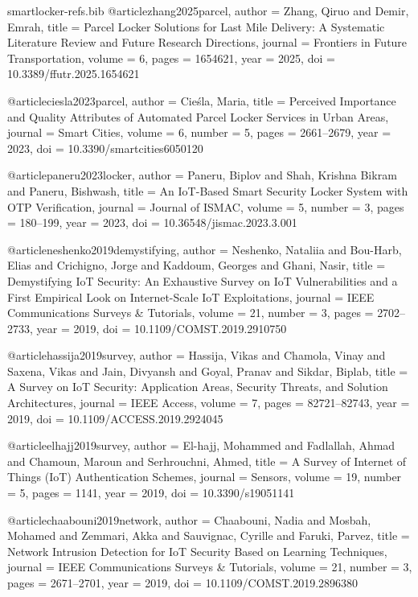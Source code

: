 \begin{filecontents*}[overwrite]{smartlocker-refs.bib}
@article{zhang2025parcel,
  author  = {Zhang, Qiruo and Demir, Emrah},
  title   = {Parcel Locker Solutions for Last Mile Delivery: A Systematic Literature Review and Future Research Directions},
  journal = {Frontiers in Future Transportation},
  volume  = {6},
  pages   = {1654621},
  year    = {2025},
  doi     = {10.3389/ffutr.2025.1654621}
}

@article{ciesla2023parcel,
  author  = {Cie{\'s}la, Maria},
  title   = {Perceived Importance and Quality Attributes of Automated Parcel Locker Services in Urban Areas},
  journal = {Smart Cities},
  volume  = {6},
  number  = {5},
  pages   = {2661--2679},
  year    = {2023},
  doi     = {10.3390/smartcities6050120}
}

@article{paneru2023locker,
  author  = {Paneru, Biplov and Shah, Krishna Bikram and Paneru, Bishwash},
  title   = {An {IoT}-Based Smart Security Locker System with {OTP} Verification},
  journal = {Journal of ISMAC},
  volume  = {5},
  number  = {3},
  pages   = {180--199},
  year    = {2023},
  doi     = {10.36548/jismac.2023.3.001}
}

@article{neshenko2019demystifying,
  author  = {Neshenko, Nataliia and Bou-Harb, Elias and Crichigno, Jorge and Kaddoum, Georges and Ghani, Nasir},
  title   = {Demystifying {IoT} Security: An Exhaustive Survey on {IoT} Vulnerabilities and a First Empirical Look on Internet-Scale {IoT} Exploitations},
  journal = {IEEE Communications Surveys \& Tutorials},
  volume  = {21},
  number  = {3},
  pages   = {2702--2733},
  year    = {2019},
  doi     = {10.1109/COMST.2019.2910750}
}

@article{hassija2019survey,
  author  = {Hassija, Vikas and Chamola, Vinay and Saxena, Vikas and Jain, Divyansh and Goyal, Pranav and Sikdar, Biplab},
  title   = {A Survey on {IoT} Security: Application Areas, Security Threats, and Solution Architectures},
  journal = {IEEE Access},
  volume  = {7},
  pages   = {82721--82743},
  year    = {2019},
  doi     = {10.1109/ACCESS.2019.2924045}
}

@article{elhajj2019survey,
  author  = {El-hajj, Mohammed and Fadlallah, Ahmad and Chamoun, Maroun and Serhrouchni, Ahmed},
  title   = {A Survey of {Internet of Things} ({IoT}) Authentication Schemes},
  journal = {Sensors},
  volume  = {19},
  number  = {5},
  pages   = {1141},
  year    = {2019},
  doi     = {10.3390/s19051141}
}

@article{chaabouni2019network,
  author  = {Chaabouni, Nadia and Mosbah, Mohamed and Zemmari, Akka and Sauvignac, Cyrille and Faruki, Parvez},
  title   = {Network Intrusion Detection for {IoT} Security Based on Learning Techniques},
  journal = {IEEE Communications Surveys \& Tutorials},
  volume  = {21},
  number  = {3},
  pages   = {2671--2701},
  year    = {2019},
  doi     = {10.1109/COMST.2019.2896380}
}


\end{filecontents*}
